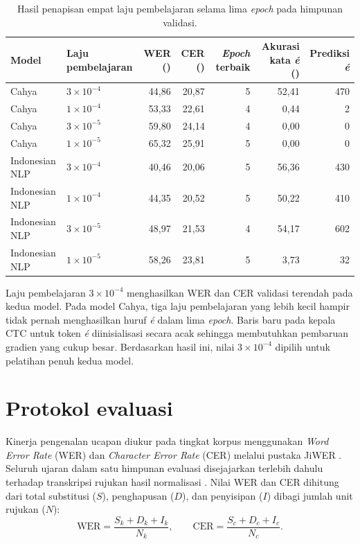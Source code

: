 \begin{table}[!htbp]
  \centering\small
  \caption{Hasil penapisan empat laju pembelajaran selama lima \textit{epoch} pada himpunan validasi.}
  \label{tab:sweep-lr}
  \begin{tabular}{@{}llrrrrr@{}}
    \toprule
    Model & Laju pembelajaran & WER (\pct{}) & CER (\pct{}) & \textit{Epoch} terbaik & Akurasi kata \textit{é} (\pct{}) & Prediksi \textit{é} \\
    \midrule
    Cahya & \(3 \times 10^{-4}\) & 44,86 & 20,87 & 5 & 52,41 & 470 \\
    Cahya & \(1 \times 10^{-4}\) & 53,33 & 22,61 & 4 & 0,44 & 2 \\
    Cahya & \(3 \times 10^{-5}\) & 59,80 & 24,14 & 4 & 0,00 & 0 \\
    Cahya & \(1 \times 10^{-5}\) & 65,32 & 25,91 & 5 & 0,00 & 0 \\
    \midrule
    Indonesian NLP & \(3 \times 10^{-4}\) & 40,46 & 20,06 & 5 & 56,36 & 430 \\
    Indonesian NLP & \(1 \times 10^{-4}\) & 44,35 & 20,52 & 5 & 50,22 & 410 \\
    Indonesian NLP & \(3 \times 10^{-5}\) & 48,97 & 21,53 & 4 & 54,17 & 602 \\
    Indonesian NLP & \(1 \times 10^{-5}\) & 58,26 & 23,81 & 5 & 3,73 & 32 \\
    \bottomrule
  \end{tabular}
\end{table}

Laju pembelajaran \(3 \times 10^{-4}\) menghasilkan WER dan CER validasi terendah pada kedua model. Pada model Cahya, tiga laju pembelajaran yang lebih kecil hampir tidak pernah menghasilkan huruf \textit{é} dalam lima \textit{epoch}. Baris baru pada kepala CTC untuk token \textit{é} diinisialisasi secara acak sehingga membutuhkan pembaruan gradien yang cukup besar. Berdasarkan hasil ini, nilai \(3 \times 10^{-4}\) dipilih untuk pelatihan penuh kedua model.

\section{Protokol evaluasi}

Kinerja pengenalan ucapan diukur pada tingkat korpus menggunakan \textit{Word Error Rate} (WER) dan \textit{Character Error Rate} (CER) melalui pustaka JiWER \cite{jiwer}. Seluruh ujaran dalam satu himpunan evaluasi disejajarkan terlebih dahulu terhadap transkripsi rujukan hasil normalisasi . Nilai WER dan CER dihitung dari total substitusi (\(S\)), penghapusan (\(D\)), dan penyisipan (\(I\)) dibagi jumlah unit rujukan (\(N\)):
\begin{equation}
  \mathrm{WER} = \frac{S_k + D_k + I_k}{N_k}, \qquad
  \mathrm{CER} = \frac{S_c + D_c + I_c}{N_c}.
\end{equation}

